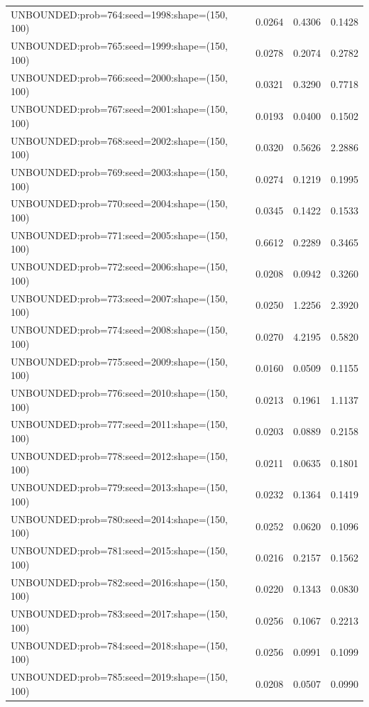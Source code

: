 \begin{longtable}{lccc}
UNBOUNDED:prob=764:seed=1998:shape=(150, 100) &   0.0264 &  0.4306 &  0.1428 \\
UNBOUNDED:prob=765:seed=1999:shape=(150, 100) &   0.0278 &  0.2074 &  0.2782 \\
UNBOUNDED:prob=766:seed=2000:shape=(150, 100) &   0.0321 &  0.3290 &  0.7718 \\
UNBOUNDED:prob=767:seed=2001:shape=(150, 100) &   0.0193 &  0.0400 &  0.1502 \\
UNBOUNDED:prob=768:seed=2002:shape=(150, 100) &   0.0320 &  0.5626 &  2.2886 \\
UNBOUNDED:prob=769:seed=2003:shape=(150, 100) &   0.0274 &  0.1219 &  0.1995 \\
UNBOUNDED:prob=770:seed=2004:shape=(150, 100) &   0.0345 &  0.1422 &  0.1533 \\
UNBOUNDED:prob=771:seed=2005:shape=(150, 100) &   0.6612 &  0.2289 &  0.3465 \\
UNBOUNDED:prob=772:seed=2006:shape=(150, 100) &   0.0208 &  0.0942 &  0.3260 \\
UNBOUNDED:prob=773:seed=2007:shape=(150, 100) &   0.0250 &  1.2256 &  2.3920 \\
UNBOUNDED:prob=774:seed=2008:shape=(150, 100) &   0.0270 &  4.2195 &  0.5820 \\
UNBOUNDED:prob=775:seed=2009:shape=(150, 100) &   0.0160 &  0.0509 &  0.1155 \\
UNBOUNDED:prob=776:seed=2010:shape=(150, 100) &   0.0213 &  0.1961 &  1.1137 \\
UNBOUNDED:prob=777:seed=2011:shape=(150, 100) &   0.0203 &  0.0889 &  0.2158 \\
UNBOUNDED:prob=778:seed=2012:shape=(150, 100) &   0.0211 &  0.0635 &  0.1801 \\
UNBOUNDED:prob=779:seed=2013:shape=(150, 100) &   0.0232 &  0.1364 &  0.1419 \\
UNBOUNDED:prob=780:seed=2014:shape=(150, 100) &   0.0252 &  0.0620 &  0.1096 \\
UNBOUNDED:prob=781:seed=2015:shape=(150, 100) &   0.0216 &  0.2157 &  0.1562 \\
UNBOUNDED:prob=782:seed=2016:shape=(150, 100) &   0.0220 &  0.1343 &  0.0830 \\
UNBOUNDED:prob=783:seed=2017:shape=(150, 100) &   0.0256 &  0.1067 &  0.2213 \\
UNBOUNDED:prob=784:seed=2018:shape=(150, 100) &   0.0256 &  0.0991 &  0.1099 \\
UNBOUNDED:prob=785:seed=2019:shape=(150, 100) &   0.0208 &  0.0507 &  0.0990 \\

\end{longtable}
